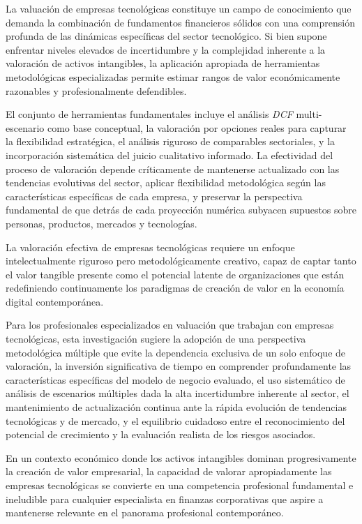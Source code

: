 La valuación de empresas tecnológicas constituye un campo de conocimiento que demanda la combinación de fundamentos financieros sólidos con una comprensión profunda de las dinámicas específicas del sector tecnológico. Si bien supone enfrentar niveles elevados de incertidumbre y la complejidad inherente a la valoración de activos intangibles, la aplicación apropiada de herramientas metodológicas especializadas permite estimar rangos de valor económicamente razonables y profesionalmente defendibles.

El conjunto de herramientas fundamentales incluye el análisis \emph{DCF} multi-escenario como base conceptual, la valoración por opciones reales para capturar la flexibilidad estratégica, el análisis riguroso de comparables sectoriales, y la incorporación sistemática del juicio cualitativo informado. La efectividad del proceso de valoración depende críticamente de mantenerse actualizado con las tendencias evolutivas del sector, aplicar flexibilidad metodológica según las características específicas de cada empresa, y preservar la perspectiva fundamental de que detrás de cada proyección numérica subyacen supuestos sobre personas, productos, mercados y tecnologías.

La valoración efectiva de empresas tecnológicas requiere un enfoque intelectualmente riguroso pero metodológicamente creativo, capaz de captar tanto el valor tangible presente como el potencial latente de organizaciones que están redefiniendo continuamente los paradigmas de creación de valor en la economía digital contemporánea.

Para los profesionales especializados en valuación que trabajan con empresas tecnológicas, esta investigación sugiere la adopción de una perspectiva metodológica múltiple que evite la dependencia exclusiva de un solo enfoque de valoración, la inversión significativa de tiempo en comprender profundamente las características específicas del modelo de negocio evaluado, el uso sistemático de análisis de escenarios múltiples dada la alta incertidumbre inherente al sector, el mantenimiento de actualización continua ante la rápida evolución de tendencias tecnológicas y de mercado, y el equilibrio cuidadoso entre el reconocimiento del potencial de crecimiento y la evaluación realista de los riesgos asociados.

En un contexto económico donde los activos intangibles dominan progresivamente la creación de valor empresarial, la capacidad de valorar apropiadamente las empresas tecnológicas se convierte en una competencia profesional fundamental e ineludible para cualquier especialista en finanzas corporativas que aspire a mantenerse relevante en el panorama profesional contemporáneo. 